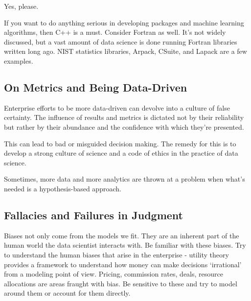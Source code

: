 \documentclass[
  11pt,
]{book}
\begin{document}
Yes, please.

If you want to do anything serious in developing packages and machine learning algorithms, then C++ is a must. Consider Fortran as well. It's not widely discussed, but a vast amount of data science is done running Fortran libraries written long ago. NIST statistics libraries, Arpack, CSuite, and Lapack are a few examples.

\hypertarget{on-metrics-and-being-data-driven}{%
\subsection{On Metrics and Being Data-Driven}\label{on-metrics-and-being-data-driven}}

Enterprise efforts to be more data-driven can devolve into a culture of false certainty. The influence of results and metrics is dictated not by their reliability but rather by their abundance and the confidence with which they're presented.

This can lead to bad or misguided decision making. The remedy for this is to develop a strong culture of science and a code of ethics in the practice of data science.

Sometimes, more data and more analytics are thrown at a problem when what's needed is a hypothesis-based approach.

\hypertarget{fallacies-and-failures-in-judgment}{%
\subsection{Fallacies and Failures in Judgment}\label{fallacies-and-failures-in-judgment}}

Biases not only come from the models we fit. They are an inherent part of the human world the data scientist interacts with. Be familiar with these biases. Try to understand the human biases that arise in the enterprise - utility theory provides a framework to understand how money can make decisions
`irrational' from a modeling point of view. Pricing, commission rates, deals, resource allocations are areas fraught with bias. Be sensitive to these and try to model around them or account for them directly.
\end{document}
